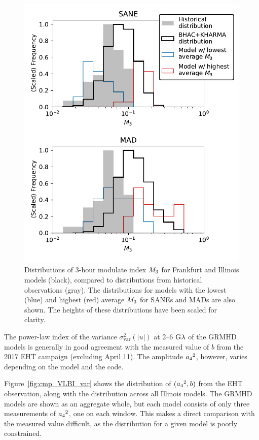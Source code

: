 \begin{figure}
  \centering
  \includegraphics[width=\columnwidth]{./figures/mi_hist.pdf}
  \caption{Distributions of 3-hour modulate index $M_{3}$ for Frankfurt and Illinois models (black), compared to distributions from historical observations (gray). The distributions for models with the lowest (blue) and highest (red) average $M_{3}$ for SANEs and MADs are also shown. The heights of these distributions have been scaled for clarity.
  }
  \label{fig:cmp_ALMA_var}
\end{figure}


The power-law index of the variance $\sigma_\text{var}^2 (|u|)$ at 2--6$~{\rm G}\lambda$ of the GRMHD models is generally in good agreement with the measured value of $b$ from the 2017 EHT campaign (excluding April 11). The amplitude ${a_4}^2$, however, varies depending on the model and the code.

Figure~\ref{fig:cmp_VLBI_var} shows the distribution of $({a_4}^2, b)$ from the EHT observation, along with the distribution across all Illinois models. The GRMHD models are shown as an aggregate whole, but each model consists of only three measurements of ${a_4}^2$, one on each window. This makes a direct comparison with the measured value difficult, as the distribution for a given model is poorly constrained.

